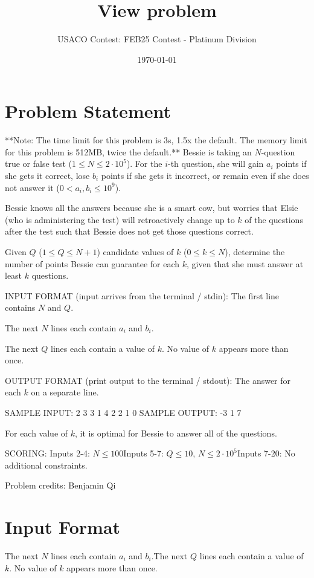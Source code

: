\documentclass[12pt]{article}
\title{View problem}
\author{USACO Contest: FEB25 Contest - Platinum Division}
\date{\today}
\begin{document}
\maketitle

\section*{Problem Statement}


**Note: The time limit for this problem is 3s, 1.5x the default. The memory
limit for this problem is 512MB, twice the default.**
Bessie is taking an $N$-question true or false test ($1\le N\le 2\cdot 10^5$).
For the $i$-th question, she will gain $a_i$ points if she gets it correct, lose
$b_i$ points if she gets it incorrect, or remain even if she does not answer it
($0<a_i,b_i\le 10^9$).

Bessie knows all the answers because she is a smart cow, but worries that Elsie
(who is administering the test) will retroactively change up to $k$ of the
questions after the test such that Bessie does not get those questions correct.

Given $Q$ ($1\le Q\le N+1$) candidate values of $k$ ($0\le k\le N$), determine
the number of points Bessie can guarantee for each $k$, given that she must
answer at least $k$ questions.

INPUT FORMAT (input arrives from the terminal / stdin):
The first line contains $N$ and $Q$.

The next $N$ lines each contain $a_i$ and $b_i$.

The next $Q$ lines each contain a value of $k$. No value of $k$ appears more
than once.

OUTPUT FORMAT (print output to the terminal / stdout):
The answer for each $k$ on a separate line.

SAMPLE INPUT:
2 3
3 1
4 2
2
1
0
SAMPLE OUTPUT: 
-3
1
7

For each value of $k$, it is optimal for Bessie to answer all of the questions.

SCORING:
Inputs 2-4: $N\le 100$Inputs 5-7: $Q\le 10$,
$N\le 2\cdot 10^5$Inputs 7-20: No additional constraints.


Problem credits: Benjamin Qi



\section*{Input Format}
The next $N$ lines each contain $a_i$ and $b_i$.The next $Q$ lines each contain a value of $k$. No value of $k$ appears more
than once.
\end{document}
